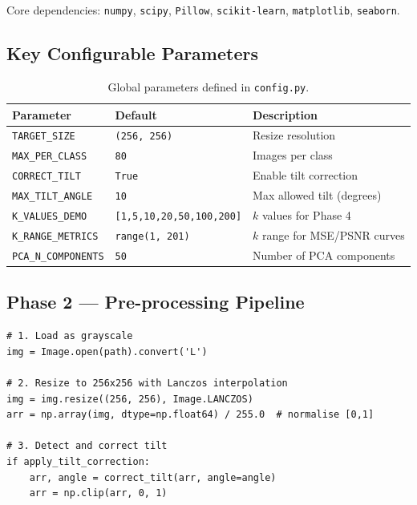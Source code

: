 \documentclass[11pt,a4paper]{article}
\theoremstyle{definition}
\begin{document}
\noindent Core dependencies: \texttt{numpy}, \texttt{scipy}, \texttt{Pillow},
\texttt{scikit-learn}, \texttt{matplotlib}, \texttt{seaborn}.

\subsection{Key Configurable Parameters}

\begin{table}[H]
\centering
\begin{tabular}{llp{6cm}}
\toprule
\textbf{Parameter} & \textbf{Default} & \textbf{Description} \\
\midrule
\texttt{TARGET\_SIZE}     & \texttt{(256, 256)} & Resize resolution \\
\texttt{MAX\_PER\_CLASS}  & \texttt{80}         & Images per class \\
\texttt{CORRECT\_TILT}    & \texttt{True}       & Enable tilt correction \\
\texttt{MAX\_TILT\_ANGLE} & \texttt{10}         & Max allowed tilt (degrees) \\
\texttt{K\_VALUES\_DEMO}  & \texttt{[1,5,10,20,50,100,200]} & $k$ values for Phase 4 \\
\texttt{K\_RANGE\_METRICS}& \texttt{range(1, 201)} & $k$ range for MSE/PSNR curves \\
\texttt{PCA\_N\_COMPONENTS} & \texttt{50}       & Number of PCA components \\
\bottomrule
\end{tabular}
\caption{Global parameters defined in \texttt{config.py}.}
\end{table}

\subsection{Phase 2 --- Pre-processing Pipeline}

\begin{lstlisting}[caption={Core pre-processing pipeline in \texttt{data\_loader.py}}]
# 1. Load as grayscale
img = Image.open(path).convert('L')

# 2. Resize to 256x256 with Lanczos interpolation
img = img.resize((256, 256), Image.LANCZOS)
arr = np.array(img, dtype=np.float64) / 255.0  # normalise [0,1]

# 3. Detect and correct tilt
if apply_tilt_correction:
    arr, angle = correct_tilt(arr, angle=angle)
    arr = np.clip(arr, 0, 1)
\end{lstlisting}
\end{document}
